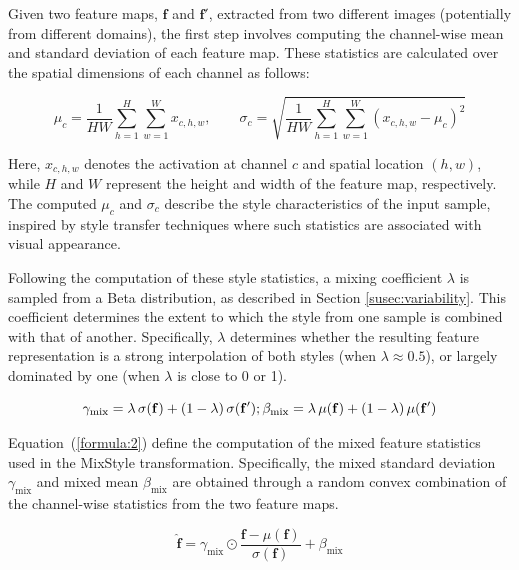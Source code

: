 Given two feature maps, $\mathbf{f}$ and $\mathbf{f'}$, extracted from two different images (potentially from different domains), the first step involves computing the channel-wise mean and standard deviation of each feature map. These statistics are calculated over the spatial dimensions of each channel as follows:

\begin{equation}
	\mu_c = \frac{1}{HW} \sum_{h=1}^{H} \sum_{w=1}^{W} x_{c,h,w}, \qquad
	\sigma_c = \sqrt{ \frac{1}{HW} \sum_{h=1}^{H} \sum_{w=1}^{W} (x_{c,h,w} - \mu_c)^2 }
\end{equation}

Here, $x_{c,h,w}$ denotes the activation at channel $c$ and spatial location $(h, w)$, while $H$ and $W$ represent the height and width of the feature map, respectively. The computed $\mu_c$ and $\sigma_c$ describe the style characteristics of the input sample, inspired by style transfer techniques where such statistics are associated with visual appearance.

Following the computation of these style statistics, a mixing coefficient $\lambda$ is sampled from a Beta distribution, as described in Section \ref{susec:variability}. This coefficient determines the extent to which the style from one sample is combined with that of another. Specifically, $\lambda$ determines whether the resulting feature representation is a strong interpolation of both styles (when $\lambda \approx 0.5$), or largely dominated by one (when $\lambda$ is close to 0 or 1). 

\begin{equation}\label{formula:2}
	\gamma_{\text{mix}} = \lambda \, \sigma(\mathbf{f}) + (1 - \lambda) \, \sigma(\mathbf{f}') \\ ;
	\beta_{\text{mix}} = \lambda \, \mu(\mathbf{f}) + (1 - \lambda) \, \mu(\mathbf{f}') \\
\end{equation}

Equation~(\ref{formula:2}) define the computation of the mixed feature statistics used in the MixStyle transformation. Specifically, the mixed standard deviation $\gamma_{\text{mix}}$ and mixed mean $\beta_{\text{mix}}$ are obtained through a random convex combination of the channel-wise statistics from the two feature maps. 

\begin{equation}\label{formula:3}
	\hat{\mathbf{f}} = \gamma_{\text{mix}} \odot \frac{\mathbf{f} - \mu(\mathbf{f})}{\sigma(\mathbf{f})} + \beta_{\text{mix}}
\end{equation}

